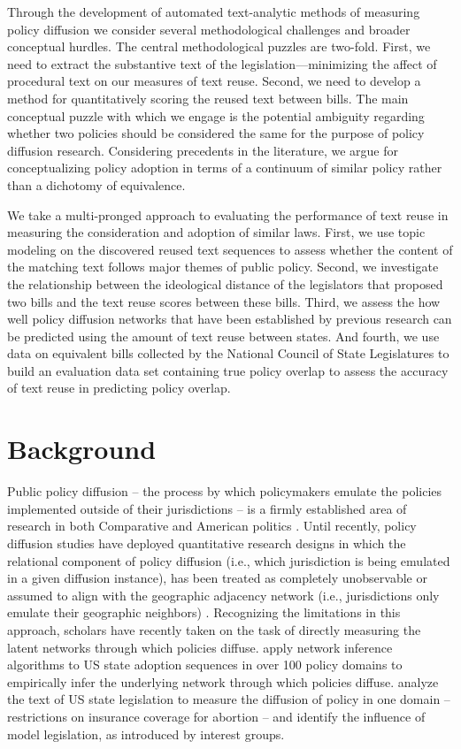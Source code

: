 \documentclass[12pt]{article} %
\begin{document}
Through the development of automated text-analytic methods of measuring policy diffusion we consider several methodological challenges and broader conceptual hurdles. The central methodological puzzles are two-fold. First, we need to extract the substantive text of the legislation---minimizing the affect of procedural text on our measures of text reuse. Second, we need to develop a method for quantitatively scoring the reused text between bills. The main conceptual puzzle with which we engage is the potential ambiguity regarding whether two policies should be considered the same for the purpose of policy diffusion research. Considering precedents in the literature, we argue for conceptualizing policy adoption in terms of a continuum of similar policy rather than a dichotomy of equivalence.

We take a multi-pronged approach to evaluating the performance of text reuse in measuring the consideration and adoption of similar laws. First, we use topic modeling on the discovered reused text sequences to assess whether the content of the matching text follows major themes of public policy. Second, we investigate the relationship between the ideological distance of the legislators that proposed two bills and the text reuse scores between these bills. Third, we assess the how well policy diffusion networks that have been established by previous research can be predicted using the amount of text reuse between states. And fourth, we use data on equivalent bills collected by the National Council of State Legislatures to build an evaluation data set containing true policy overlap to assess the accuracy of text reuse in predicting policy overlap.

\section{Background}

Public policy diffusion -- the process by which policymakers emulate the policies implemented outside of their jurisdictions -- is a firmly established area of research in both Comparative \citep{simmons2004,gilardi2009} and American politics \citep{walker1969,berry1990,shipan2006,nicholson-crotty2009}. Until recently, policy diffusion studies have deployed quantitative research designs in which the relational component of policy diffusion (i.e., which jurisdiction is being emulated in a given diffusion instance), has been treated as completely unobservable or assumed to align with the geographic adjacency network (i.e., jurisdictions only emulate their geographic neighbors) \citep{volden2006,boehmke2009}. Recognizing the limitations in this approach, scholars have recently taken on the task of directly measuring the latent networks through which policies diffuse. \cite{desmarais2015} apply network inference algorithms to US state adoption sequences in over 100 policy domains to empirically infer the underlying network through which policies diffuse. \cite{garrett2015} analyze the text of US state legislation to measure the diffusion of policy in one domain -- restrictions on insurance coverage for abortion -- and identify the influence of model legislation, as introduced by interest groups.
\end{document}

